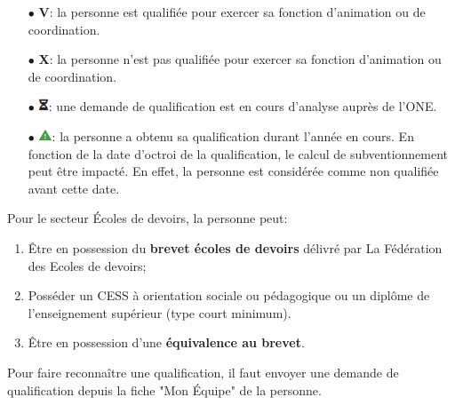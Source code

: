 \begin{itemize}
    \item [$\bullet$]\textbf{\textcolor{bleu}{V}}: la personne est qualifiée pour exercer sa fonction d'animation ou de coordination. 
    \item [$\bullet$]\textbf{\textcolor{rouge}{X}}: la personne n'est pas qualifiée pour exercer sa fonction d'animation ou de coordination. 
    \item [$\bullet$]\includegraphics[width=0.3cm]{Images/icon/icon_sablier.png}: une demande de qualification est en cours d'analyse auprès de l'ONE. 
    \item [$\bullet$]\includegraphics[width=0.4cm]{Images/icon/icon_attention.png}: la personne a obtenu sa qualification durant l'année en cours. En fonction de la date d'octroi de la qualification, le calcul de subventionnement peut être impacté. En effet, la personne est considérée comme non qualifiée avant cette date. 
\end{itemize}
\vspace*{3mm}

\begin{tcolorbox}[title=Les trois possibilités de qualification EDD]
Pour le secteur Écoles de devoirs, la personne peut: 

\begin{enumerate}
    \item Être en possession du \textbf{brevet écoles de devoirs} délivré par La Fédération des Ecoles de devoirs;
    \item Posséder un CESS à orientation sociale ou pédagogique ou un diplôme de l'enseignement supérieur (type court minimum).  
    \item Être en possession d'une \textbf{équivalence au brevet}.
\end{enumerate}
Pour faire reconnaître une qualification, il faut envoyer une demande de qualification depuis la fiche "Mon Équipe" de la personne. 
\end{tcolorbox}


